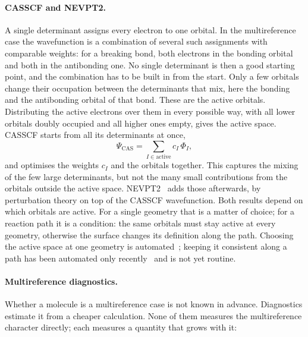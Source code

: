 \paragraph{CASSCF and NEVPT2.} A single determinant assigns every
electron to one orbital. In the multireference case the wavefunction
is a combination of several such assignments with comparable weights:
for a breaking bond, both electrons in the bonding orbital and both in
the antibonding one. No single determinant is then a good starting
point, and the combination has to be built in from the start. Only a
few orbitals change their occupation between the determinants that
mix, here the bonding and the antibonding orbital of that bond. These
are the active orbitals. Distributing the active electrons over them
in every possible way, with all lower orbitals doubly occupied and all
higher ones empty, gives the active space. CASSCF starts from all its
determinants at once,
%
\begin{equation}
  \Psi_\text{CAS} = \sum_{I \in \text{active}} c_I \,\Phi_I ,
\end{equation}
%
and optimises the weights $c_I$ and the orbitals together. This
captures the mixing of the few large determinants, but not the many
small contributions from the orbitals outside the active space.
NEVPT2~\cite{angeli2001} adds those afterwards, by perturbation theory
on top of the CASSCF wavefunction. Both results depend on which
orbitals are active. For a single geometry that is a
matter of choice; for a reaction path it is a condition: the same orbitals
must stay active at every geometry, otherwise the surface changes its
definition along the path. Choosing the active space at one geometry is
automated~\cite{sayfutyarova2017, stein2019autocas}; keeping it consistent
along a path has been automated only recently~\cite{bensberg2023,
seal2025wasp} and is not yet routine.

\paragraph{Multireference diagnostics.} Whether a molecule is a
multireference case is not known in advance. Diagnostics estimate it from
a cheaper calculation. None of them measures the multireference character
directly; each measures a quantity that grows with it:

